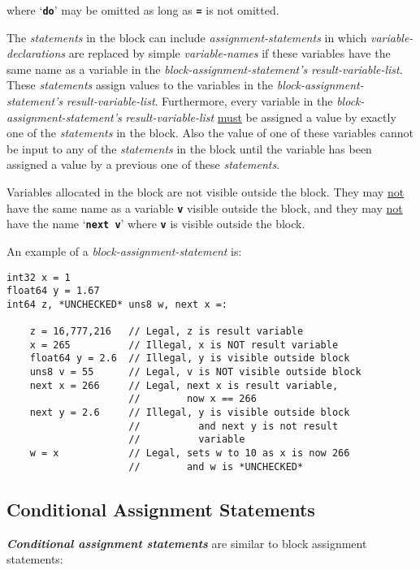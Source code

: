 \documentclass[12pt]{article}
\newcommand{\TT}[1]{{\tt \bfseries #1}}
\newcommand{\ikey}[2]{{\bf \em #1}\index{#2}}
\newenvironment{indpar}[1][0.3in]%
	{\begin{list}{}%
		     {\setlength{\itemsep}{0in}%
		      \setlength{\topsep}{0in}%
		      \setlength{\parsep}{1ex}%
		      \setlength{\labelwidth}{#1}%
		      \setlength{\leftmargin}{#1}%
		      \addtolength{\leftmargin}{\labelsep}}%
	 \item}%
	{\end{list}}
\begin{document}
where `\TT{do}' may be omitted as long as \TT{=} is not omitted.

The {\em statements} in the block can include
{\em assignment-statements} in which {\em variable-declarations}
are replaced by simple {\em variable-names}
if these variables have the same name as a variable
in the {\em block-assignment-statement's} {\em result-variable-list}.
These {\em statements} assign values to the variables
in the {\em block-assignment-statement's} {\em result-variable-list}.
Furthermore, every variable in the
{\em block-assignment-statement's} {\em result-variable-list}
\underline{must} be assigned a value
by exactly one of the {\em statements} in the block.
Also the value of one of these variables cannot
be input to any of the {\em statements} in the block until the
variable has been assigned a value by a previous one of these
{\em statements}.

Variables allocated in the block are not visible outside the
block.  They may \underline{not} have the same name as a variable
\TT{v} visible outside the block,  and they may \underline{not}
have the name `\TT{next v}' where  \TT{v} is visible outside the block.

An example of a {\em block-assignment-statement} is:
\begin{indpar}\begin{verbatim}
int32 x = 1
float64 y = 1.67
int64 z, *UNCHECKED* uns8 w, next x =:

    z = 16,777,216   // Legal, z is result variable
    x = 265          // Illegal, x is NOT result variable
    float64 y = 2.6  // Illegal, y is visible outside block
    uns8 v = 55      // Legal, v is NOT visible outside block
    next x = 266     // Legal, next x is result variable,
                     //        now x == 266
    next y = 2.6     // Illegal, y is visible outside block
                     //          and next y is not result
                     //          variable
    w = x            // Legal, sets w to 10 as x is now 266
                     //        and w is *UNCHECKED*
\end{verbatim}\end{indpar}

\subsection{Conditional Assignment Statements}
\label{CONDITIONAL-ASSIGNMENT-STATEMENTS}

\ikey{Conditional assignment statements}{conditional assignment}
are similar to block assignment statements:
\end{document}
